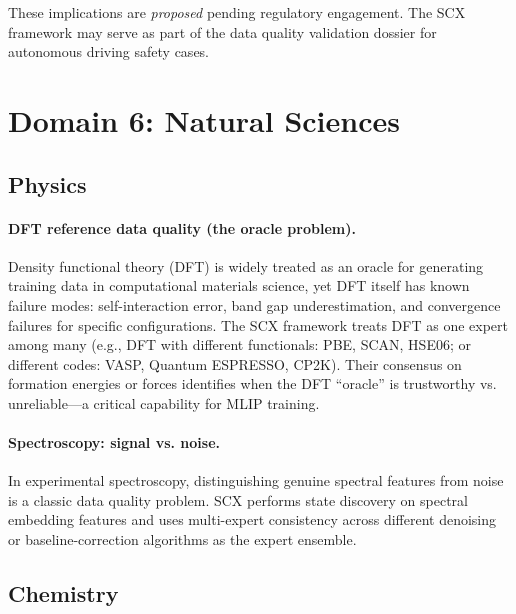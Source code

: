 \documentclass[twocolumn]{article}
\theoremstyle{definition}
\begin{document}
These implications are \emph{proposed} pending regulatory engagement. The SCX framework may serve as part of the data quality validation dossier for autonomous driving safety cases.

\section{Domain 6: Natural Sciences}

\subsection{Physics}

\paragraph{DFT reference data quality (the oracle problem).}
Density functional theory (DFT) is widely treated as an oracle for generating training data in computational materials science, yet DFT itself has known failure modes: self-interaction error, band gap underestimation, and convergence failures for specific configurations. The SCX framework treats DFT as one expert among many (e.g., DFT with different functionals: PBE, SCAN, HSE06; or different codes: VASP, Quantum ESPRESSO, CP2K). Their consensus on formation energies or forces identifies when the DFT ``oracle'' is trustworthy vs. unreliable---a critical capability for MLIP training.

\paragraph{Spectroscopy: signal vs. noise.}
In experimental spectroscopy, distinguishing genuine spectral features from noise is a classic data quality problem. SCX performs state discovery on spectral embedding features and uses multi-expert consistency across different denoising or baseline-correction algorithms as the expert ensemble.

\subsection{Chemistry}
\end{document}
